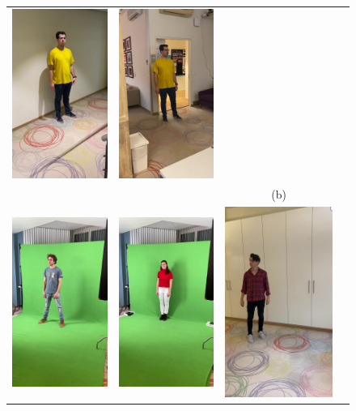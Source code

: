 \begin{figure}
\begin{tabular}{@{}cccc@{}}
  \includegraphics[width=0.187\linewidth]{figures/dataset_images/dominik_stairs_cloth_yellow_phone1.jpg}&
  \includegraphics[width=0.187\linewidth]{figures/dataset_images/dominik_office_cloth_yellow_phone2.jpg}\\
  & & (b) \\
  \includegraphics[width=0.187\linewidth]{figures/dataset_images/mattia_green_cloth_short_phone1.jpg}&
  \includegraphics[width=0.187\linewidth]{figures/dataset_images/francesca_green_cloth_red_phone1.jpg}&
  \includegraphics[width=0.187\linewidth]{figures/dataset_images/martin_cubard_cloth_red_phone2.jpg}&

\end{tabular}
\end{figure}
